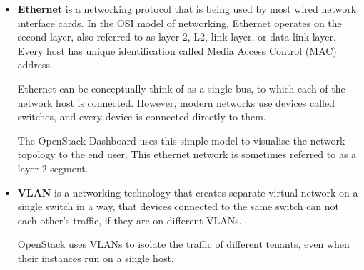 \begin{itemize}
  \item{\textbf{Ethernet} is a networking protocol that is being used by most wired network interface cards. In the OSI model of networking, Ethernet operates on the second layer, also referred to as layer 2, L2, link layer, or data link layer. Every host has unique identification called Media Access Control (MAC) address.

  Ethernet can be conceptually think of as a single bus, to which each of the network host is connected. However, modern networks use devices called switches, and every device is connected directly to them.

  The OpenStack Dashboard uses this simple model to visualise the network topology to the end user. This ethernet network is sometimes referred to as a layer 2 segment.}
  \item{\textbf{VLAN} is a networking technology that creates separate virtual network on a single switch in a way, that devices connected to the same switch can not each other's traffic, if they are on different VLANs.

  OpenStack uses VLANs to isolate the traffic of different tenants, even when their instances run on a single host.

}
\end{itemize}
